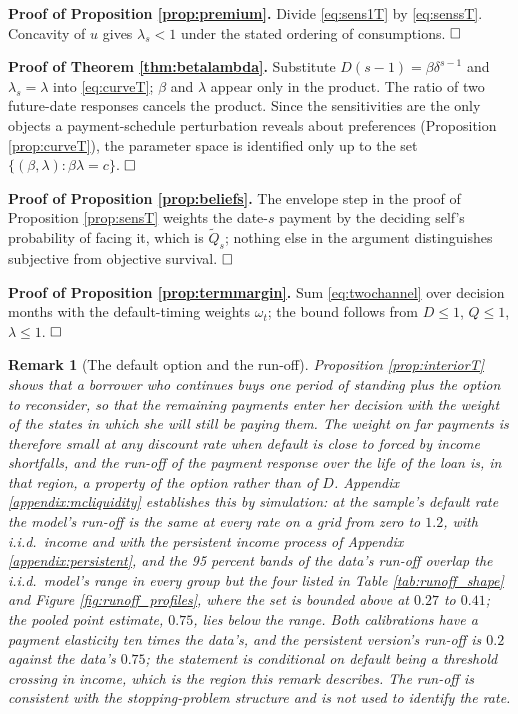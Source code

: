 \documentclass[12pt,english]{article}
\newtheorem{remark}[theorem]{Remark}
\begin{document}
\noindent\textbf{Proof of Proposition \ref{prop:premium}.} Divide \eqref{eq:sens1T} by \eqref{eq:senssT}. Concavity of $u$ gives $\lambda_s < 1$ under the stated ordering of consumptions. $\hfill\square$

\noindent\textbf{Proof of Theorem \ref{thm:betalambda}.} Substitute $D(s-1) = \beta\delta^{s-1}$ and $\lambda_s = \lambda$ into \eqref{eq:curveT}; $\beta$ and $\lambda$ appear only in the product. The ratio of two future-date responses cancels the product. Since the sensitivities are the only objects a payment-schedule perturbation reveals about preferences (Proposition \ref{prop:curveT}), the parameter space is identified only up to the set $\{(\beta, \lambda): \beta\lambda = c\}$. $\hfill\square$

\noindent\textbf{Proof of Proposition \ref{prop:beliefs}.} The envelope step in the proof of Proposition \ref{prop:sensT} weights the date-$s$ payment by the deciding self's probability of facing it, which is $\tilde Q_s$; nothing else in the argument distinguishes subjective from objective survival. $\hfill\square$

\noindent\textbf{Proof of Proposition \ref{prop:termmargin}.} Sum \eqref{eq:twochannel} over decision months with the default-timing weights $\omega_t$; the bound follows from $D \le 1$, $Q \le 1$, $\lambda \le 1$. $\hfill\square$

\begin{remark}[The default option and the run-off]\label{rem:option}
Proposition \ref{prop:interiorT} shows that a borrower who continues buys one period of standing plus the option to reconsider, so that the remaining payments enter her decision with the weight of the states in which she will still be paying them. The weight on far payments is therefore small at any discount rate when default is close to forced by income shortfalls, and the run-off of the payment response over the life of the loan is, in that region, a property of the option rather than of $D$. Appendix \ref{appendix:mcliquidity} establishes this by simulation: at the sample's default rate the model's run-off is the same at every rate on a grid from zero to $1.2$, with i.i.d.\ income and with the persistent income process of Appendix \ref{appendix:persistent}, and the 95 percent bands of the data's run-off overlap the i.i.d.\ model's range in every group but the four listed in Table \ref{tab:runoff_shape} and Figure \ref{fig:runoff_profiles}, where the set is bounded above at $0.27$ to $0.41$; the pooled point estimate, $0.75$, lies below the range. Both calibrations have a payment elasticity ten times the data's, and the persistent version's run-off is $0.2$ against the data's $0.75$; the statement is conditional on default being a threshold crossing in income, which is the region this remark describes. The run-off is consistent with the stopping-problem structure and is not used to identify the rate.
\end{remark}
\end{document}
